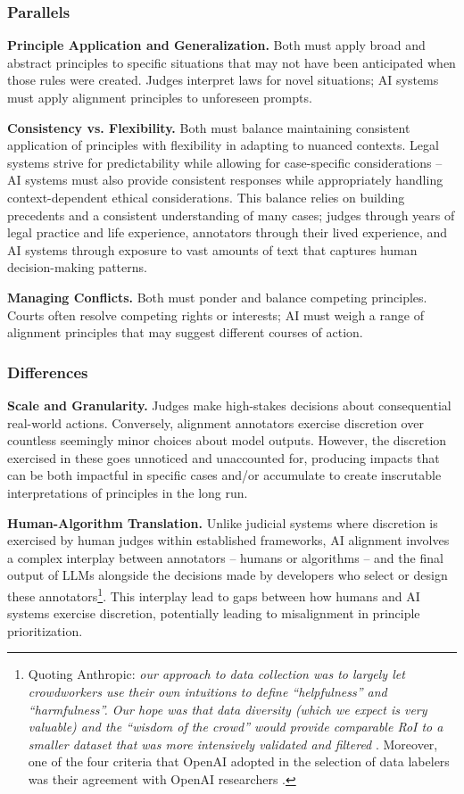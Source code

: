 \documentclass{article}
\begin{document}
\subsubsection{Parallels}
\textbf{Principle Application and Generalization.} Both must apply broad and abstract principles to specific situations that may not have been anticipated when those rules were created. Judges interpret laws for novel situations; AI systems must apply alignment principles to unforeseen prompts.

\textbf{Consistency vs. Flexibility.} Both must balance maintaining consistent application of principles with flexibility in adapting to nuanced contexts. Legal systems strive for predictability while allowing for case-specific considerations \cite{hart2012concept} -- AI systems must also provide consistent responses while appropriately handling context-dependent ethical considerations. This balance relies on building precedents and a consistent understanding of many cases; 
judges through years of legal practice and life experience, annotators through their lived experience, and AI systems through exposure to vast amounts of text that captures human decision-making patterns.

\textbf{Managing Conflicts.} Both must ponder and balance competing principles. Courts often resolve competing rights or interests; AI must weigh a range of alignment principles that may suggest different courses of action.


\subsubsection{Differences}
\textbf{Scale and Granularity.} Judges make high-stakes decisions about consequential real-world actions. Conversely, alignment annotators exercise discretion over countless seemingly minor choices about model outputs. However, the discretion exercised in these goes unnoticed and unaccounted for, producing impacts that can be both impactful in specific cases and/or accumulate to create inscrutable interpretations of principles in the long run.
    
    
    

\textbf{Human-Algorithm Translation.} Unlike judicial systems where discretion is exercised by human judges within established frameworks, AI alignment involves a complex interplay between annotators -- humans or algorithms -- and the final output of LLMs alongside the decisions made by developers who select or design these annotators\footnote{Quoting Anthropic: \emph{our approach to data collection was to largely let crowdworkers use their own intuitions to define ``helpfulness'' and ``harmfulness''. Our hope was that data diversity (which we expect is very valuable) and the ``wisdom of the crowd'' would provide comparable RoI to a smaller dataset that was more intensively validated and filtered} \cite{bai2022traininghelpfulharmlessassistant}. Moreover, one of the four criteria that OpenAI adopted in the selection of data labelers was their agreement with OpenAI researchers \cite[Appendix B.1]{ouyang2022training}.}. This interplay lead to gaps between how humans and AI systems exercise discretion, potentially leading to misalignment in principle prioritization. 
    
\end{document}
